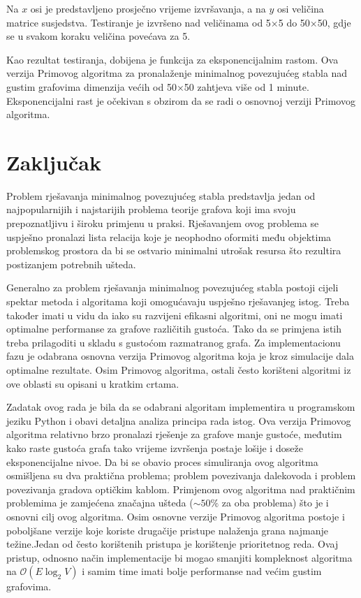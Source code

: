 \documentclass[conference]{IEEEtran}
\begin{document}
Na $x$ osi je predstavljeno prosječno vrijeme izvršavanja, a na $y$ osi veličina matrice susjedstva. Testiranje je izvršeno nad veličinama od 5×5 do 50×50, gdje se u svakom koraku veličina povećava za 5.

Kao rezultat testiranja, dobijena je funkcija za eksponencijalnim rastom. Ova verzija Primovog algoritma za pronalaženje minimalnog povezujućeg stabla nad gustim grafovima dimenzija većih od 50×50 zahtjeva više od 1 minute. Eksponencijalni rast je očekivan s obzirom da se radi o osnovnoj verziji Primovog algoritma.


\section{Zaključak}
Problem rješavanja minimalnog povezujućeg stabla predstavlja jedan od najpopularnijih i najstarijih problema teorije grafova koji ima svoju prepoznatljivu i široku primjenu u praksi. Rješavanjem ovog problema se uspješno pronalazi lista relacija koje je neophodno oformiti među objektima problemskog prostora da bi se ostvario minimalni utrošak resursa što rezultira postizanjem potrebnih ušteda.

Generalno za problem rješavanja minimalnog povezujućeg stabla postoji cijeli spektar metoda i algoritama koji omogućavaju uspješno rješavanjeg istog. Treba također imati u vidu da iako su razvijeni efikasni algoritmi, oni ne mogu imati optimalne performanse za grafove različitih gustoća. Tako da se primjena istih treba prilagoditi u skladu s gustoćom razmatranog grafa. Za implementacionu fazu je odabrana osnovna verzija Primovog algoritma koja je kroz simulacije dala optimalne rezultate. Osim Primovog algoritma, ostali često korišteni algoritmi iz ove oblasti su opisani u kratkim crtama.

Zadatak ovog rada je bila da se odabrani algoritam implementira u programskom jeziku Python i obavi detaljna analiza principa rada istog.
Ova verzija Primovog algoritma relativno brzo pronalazi rješenje za grafove manje gustoće, međutim kako raste gustoća grafa tako vrijeme izvršenja postaje lošije i doseže eksponencijalne nivoe. Da bi se obavio proces simuliranja ovog algoritma osmišljena su dva praktična problema; problem povezivanja dalekovoda i problem povezivanja gradova optičkim kablom.
Primjenom ovog algoritma nad praktičnim problemima  je zamjećena značajna ušteda ($\sim50\%$ za oba problema) što je i osnovni cilj ovog algoritma. Osim osnovne verzije Primovog algoritma postoje i poboljšane verzije koje koriste drugačije pristupe nalaženja grana najmanje težine.Jedan od često korištenih pristupa je korištenje prioritetnog reda. Ovaj pristup, odnosno način implementacije bi mogao smanjiti kompleknost algoritma na $\mathcal{O}(E\log_2 V)$ \cite{b2} i samim time imati bolje performanse nad većim gustim grafovima.
\end{document}
